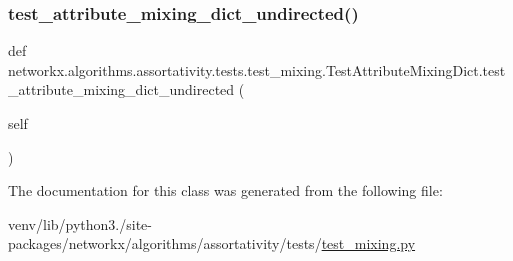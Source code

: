 \subsubsection{\texorpdfstring{test\+\_\+attribute\+\_\+mixing\+\_\+dict\+\_\+undirected()}{test\_attribute\_mixing\_dict\_undirected()}}
{\footnotesize\ttfamily def networkx.\+algorithms.\+assortativity.\+tests.\+test\+\_\+mixing.\+Test\+Attribute\+Mixing\+Dict.\+test\+\_\+attribute\+\_\+mixing\+\_\+dict\+\_\+undirected (\begin{DoxyParamCaption}\item[{}]{self }\end{DoxyParamCaption})}



The documentation for this class was generated from the following file\+:\begin{DoxyCompactItemize}
\item 
venv/lib/python3./site-\/packages/networkx/algorithms/assortativity/tests/\hyperlink{test__mixing_8py}{test\+\_\+mixing.\+py}\end{DoxyCompactItemize}
